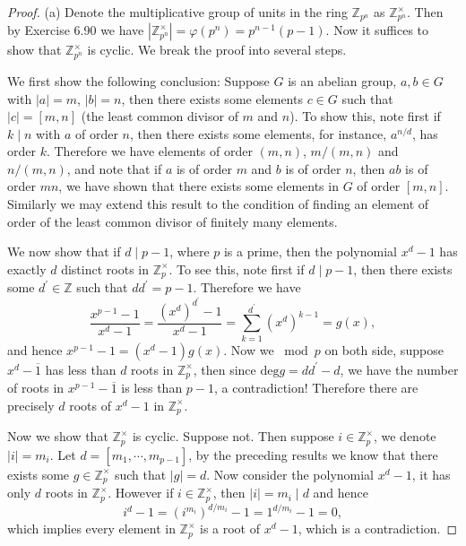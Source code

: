\begin{proof}
(a) Denote the multiplicative group of units in the ring $\mathbb{Z}_{p^n}$ as $\mathbb{Z}_{p^n}^\times$. Then by Exercise 6.90 we have $|\mathbb{Z}_{p^n}^\times|=\varphi(p^n)=p^{n-1}(p-1)$. Now it suffices to show that $\mathbb{Z}_{p^n}^\times$ is cyclic. We break the proof into several steps.\par
We first show the following conclusion: Suppose $G$ is an abelian group, $a,b\in G$ with $|a|=m$, $|b|=n$, then there exists some elements $c\in G$ such that $|c|=[m,n]$ (the least common divisor of $m$ and $n$). To show this, note first if $k\mid n$ with $a$ of order $n$, then there exists some elements, for instance, $a^{n/d}$, has order $k$. Therefore we have elements of order $(m,n)$, $m/(m,n)$ and $n/(m,n)$, and note that if $a$ is of order $m$ and $b$ is of order $n$, then $ab$ is of order $mn$, we have shown that there exists some elements in $G$ of order $[m,n]$. Similarly we may extend this result to the condition of finding an element of order of the least common divisor of finitely many elements.\par
We now show that if $d\mid p-1$, where $p$ is a prime, then the polynomial $x^d-1$ has exactly $d$ distinct roots in $\mathbb{Z}_p^\times$. To see this, note first if $d\mid p-1$, then there exists some $d^\prime\in\mathbb{Z}$ such that $dd^\prime=p-1$. Therefore we have 
$$
\frac{x^{p-1}-1}{x^d-1}=\frac{\left( x^d \right) ^{d^{\prime}}-1}{x^d-1}=\sum_{k=1}^{d^{\prime}}{\left( x^d \right) ^{k-1}}=g\left( x \right) ,
$$
and hence $x^{p-1}-1=(x^d-1)g(x)$. Now we $\bmod{p}$ on both side, suppose $x^d-\overline{1}$ has less than $d$ roots in $\mathbb{Z}_p^\times$, then since $\mathrm{deg}g=dd^\prime-d$, we have the number of roots in $x^{p-1}-\overline{1}$ is less than $p-1$, a contradiction! Therefore there are precisely $d$ roots of $x^d-1$ in $\mathbb{Z}_p^\times$.\par
Now we show that $\mathbb{Z}_p^\times$ is cyclic. Suppose not. Then suppose $i\in\mathbb{Z}_p^\times$, we denote $|i|=m_i$. Let $d=[m_1,\cdots,m_{p-1}]$, by the preceding results we know that there exists some $g\in\mathbb{Z}_p^\times$ such that $|g|=d$. Now consider the polynomial $x^d-1$, it has only $d$ roots in $\mathbb{Z}_p^\times$. However if $i\in\mathbb{Z}_p^\times$, then $|i|=m_i\mid d$ and hence 
$$
i^d-1=\left( i^{m_i} \right) ^{d/m_i}-1=1^{d/m_i}-1=0,
$$
which implies every element in $\mathbb{Z}_p^\times$ is a root of $x^d-1$, which is a contradiction.\par

\end{proof}
